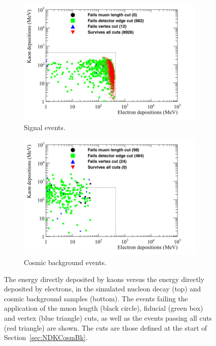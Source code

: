 \begin{figure}
  \centering
  \begin{subfigure}{0.8\textwidth}
    \includegraphics[width=\textwidth]{NucleonDecay_Kaon_vs_Elec_Can}
    \caption{Signal events.}
    \label{fig:NDK_Kaon_Elec_EDist_Sig}
  \end{subfigure}
  \begin{subfigure}{0.8\textwidth}
    \includegraphics[width=\textwidth]{CosmicBackground_Kaon_vs_Elec_Can}
    \caption{Cosmic background events.}
    \label{fig:NDK_Kaon_Elec_EDist_Cosmo}
  \end{subfigure}
  \caption[The energy directly deposited by kaons versus the energy directly deposited by electrons, in the simulated nucleon decay and cosmic background samples]
          {The energy directly deposited by kaons versus the energy directly deposited by electrons, in the simulated nucleon decay (top) and cosmic background samples (bottom). The events failing the application of the muon length (black circle), fiducial (green box) and vertex (blue triangle) cuts, as well as the events passing all cuts (red triangle) are shown. The cuts are those defined at the start of Section~\ref{sec:NDKCosmBk}.}
  \label{fig:NDK_Kaon_Elec_EDist}
\end{figure}

